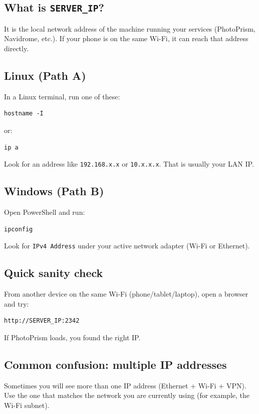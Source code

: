 \subsection*{What is \texttt{SERVER\_IP}?}
It is the local network address of the machine running your services (PhotoPrism, Navidrome, etc.).
If your phone is on the same Wi-Fi, it can reach that address directly.


\subsection{Linux (Path A)}
In a Linux terminal, run one of these:

\begin{lstlisting}
hostname -I
\end{lstlisting}

or:

\begin{lstlisting}
ip a
\end{lstlisting}

Look for an address like \texttt{192.168.x.x} or \texttt{10.x.x.x}. That is usually your LAN IP.

\subsection{Windows (Path B)}
Open PowerShell and run:

\begin{lstlisting}
ipconfig
\end{lstlisting}

Look for \texttt{IPv4 Address} under your active network adapter (Wi-Fi or Ethernet).

\subsection{Quick sanity check}
From another device on the same Wi-Fi (phone/tablet/laptop), open a browser and try:

\begin{lstlisting}
http://SERVER_IP:2342
\end{lstlisting}

If PhotoPrism loads, you found the right IP.

\subsection*{Common confusion: multiple IP addresses}
Sometimes you will see more than one IP address (Ethernet + Wi-Fi + VPN).
Use the one that matches the network you are currently using (for example, the Wi-Fi subnet).


